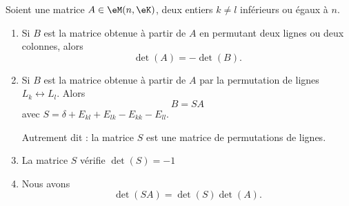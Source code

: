 \begin{proposition}    \label{PROPooFQRDooRPfuxk}
    Soient une matrice \( A\in \eM(n,\eK)\), deux entiers \( k\neq l\) inférieurs ou égaux à \( n\). 
    \begin{enumerate}
        \item   \label{ITEMooAIHWooHXzeys}
            Si \( B\) est la matrice obtenue à partir de \( A\) en permutant deux lignes ou deux colonnes, alors
            \begin{equation}
                \det(A)=-\det(B).
            \end{equation}
        \item  \label{ITEMooDNHWooOMgmxa}
            Si \( B\) est la matrice obtenue à partir de \( A\) par la permutation de lignes \( L_k\leftrightarrow L_l\). Alors
            \begin{equation}
                B=SA
            \end{equation}
            avec \( S=\delta+E_{kl}+E_{lk}-E_{kk}-E_{ll}\).

            Autrement dit : la matrice \( S\) est une matrice de permutations de lignes.
        \item \label{ITEMooSHRQooQrqVdO}
            La matrice \( S\) vérifie \( \det(S)=-1\)
        \item       \label{ITEMooQXSEooMWiKbL}
            Nous avons 
            \begin{equation}
                \det(SA)=\det(S)\det(A).
            \end{equation}
    \end{enumerate}
\end{proposition}

